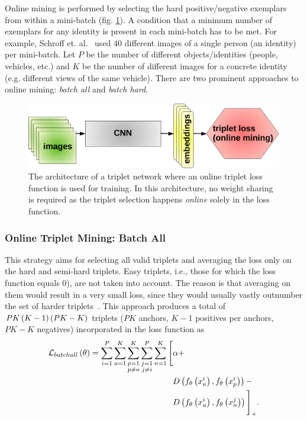 Online mining is performed by selecting the hard positive/negative exemplars from within a mini-batch (fig. \ref{fig:TripletArchitectureOnlineMining}). A condition that a minimum number of exemplars for any identity is present in each mini-batch has to be met. For example, Schroff et. al.~\cite{schroff2015facenet} used $40$ different images of a single person (an identity) per mini-batch. Let $P$ be the number of different objects/identities (people, vehicles, etc.) and $K$ be the number of different images for a concrete identity (e.g. different views of the same vehicle). There are two prominent approaches to online mining: \emph{batch all} and \emph{batch hard}.

\begin{figure}[t]
    \centerline{\includegraphics[width=0.5\linewidth]{figures/theoretical_foundations/triplet_architecture_online_mining.pdf}}
    \caption[Triplet loss online mining architecture]{The architecture of a triplet network where an online triplet loss function is used for training. In this architecture, no weight sharing is required as the triplet selection happens \emph{online} solely in the loss function.}
    \label{fig:TripletArchitectureOnlineMining}
\end{figure}

\subsubsection{Online Triplet Mining: Batch All}

This strategy aims for selecting all valid triplets and averaging the loss only on the hard and semi-hard triplets. Easy triplets, i.e., those for which the loss function equals $0$), are not taken into account. The reason is that averaging on them would result in a very small loss, since they would usually vastly outnumber the set of harder triplets~\cite{hermans2017triplet}. This approach produces a total of $PK \left( {K - 1} \right) \left( {PK - K} \right)$ triplets ($PK$ anchors, $K - 1$ positives per anchors, $PK - K$ negatives) incorporated in the loss function as
\begin{equation}
    \label{eq:BatchAllLossFunction}
    \begin{aligned}
        {\mathcal{L}_{batchall}} \left( \theta \right) =
        \sum_{i = 1}^P
        \sum_{a = 1}^K
        \sum_{\substack{p = 1 \\p \neq a}}^K
        \sum_{\substack{j = 1 \\j \neq i}}^P
        \sum_{n = 1}^K
        \Bigg[
         & \alpha +           \\
         & {D} \left( 
            {f_\theta} \left( x_a^i \right),
            {f_\theta} \left( x_p^i \right)
         \right) -                   \\
         & {D} \left( 
            {f_\theta} \left( x_a^i \right),
            {f_\theta} \left( x_n^j \right)
         \right)
        {\Bigg]}_{+}.
    \end{aligned}
\end{equation}

